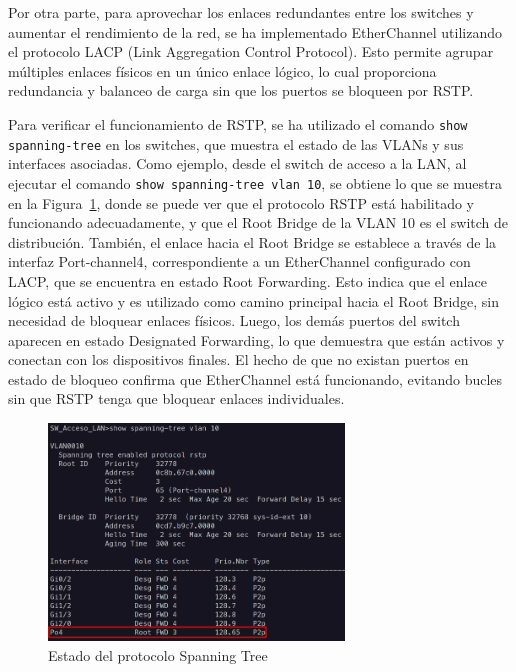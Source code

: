 \vspace{0.5cm}
Por otra parte, para aprovechar los enlaces redundantes entre los switches y aumentar el rendimiento de la red, se ha implementado EtherChannel utilizando el protocolo LACP (Link Aggregation Control Protocol). Esto permite agrupar múltiples enlaces físicos en un único enlace lógico, lo cual proporciona redundancia y balanceo de carga sin que los puertos se bloqueen por RSTP.

\vspace{0.5cm}
Para verificar el funcionamiento de RSTP, se ha utilizado el comando \lstinline[language=CiscoIOS]|show spanning-tree| en los switches, que muestra el estado de las VLANs y sus interfaces asociadas. Como ejemplo, desde el switch de acceso a la LAN, al ejecutar el comando
\lstinline[language=CiscoIOS]|show spanning-tree vlan 10|, se obtiene lo que se muestra en la Figura~\ref{fig:spanning_tree_vlan10}, donde se puede ver que el protocolo RSTP está habilitado y funcionando adecuadamente, y que el Root Bridge de la VLAN 10 es el switch de distribución. También, el enlace hacia el Root Bridge se establece a través
de la interfaz Port-channel4, correspondiente a un EtherChannel configurado con LACP, que se encuentra en estado Root Forwarding. Esto indica que el enlace lógico está activo y es utilizado como camino principal hacia el Root Bridge, sin necesidad de bloquear enlaces físicos. Luego, los demás puertos del switch aparecen en estado Designated Forwarding, lo que demuestra que están activos y conectan con los dispositivos finales. El hecho de que no existan puertos en estado de bloqueo confirma que EtherChannel está funcionando, evitando bucles sin que RSTP tenga que bloquear enlaces individuales.

\begin{figure}[htb]
	\centering
	\includegraphics[width=0.7\textwidth]{images/testSTP_SWLAN2SWDistribucion_Central.png}
	\caption{Estado del protocolo Spanning Tree}
	\label{fig:spanning_tree_vlan10}
\end{figure}

